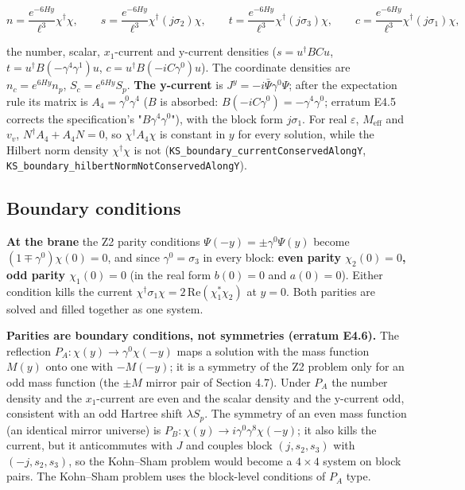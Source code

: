 \documentclass[11pt]{article}
\begin{document}
\[
n=\frac{e^{-6Hy}}{\ell^3}\chi^\dagger\chi,\qquad s=\frac{e^{-6Hy}}{\ell^3}\chi^\dagger(j\sigma_2)\chi,\qquad t=\frac{e^{-6Hy}}{\ell^3}\chi^\dagger(j\sigma_3)\chi,\qquad c=\frac{e^{-6Hy}}{\ell^3}\chi^\dagger(j\sigma_1)\chi ,
\]

the number, scalar, $x_1$-current and y-current densities ($s=u^\dagger BCu$, $t=u^\dagger B(-\gamma^4\gamma^1)u$, $c=u^\dagger B(-iC\gamma^0)u$). The coordinate densities are $n_c=e^{6Hy}n_p$, $S_c=e^{6Hy}S_p$. \textbf{The y-current} is $J^y=-i\bar\Psi\gamma^0\Psi$; after the expectation rule its matrix is $A_4=\gamma^0\gamma^4$ ($B$ is absorbed: $B(-iC\gamma^0)=-\gamma^4\gamma^0$; erratum E4.5 corrects the specification's "$B\gamma^4\gamma^0$"), with the block form $j\sigma_1$. For real $\varepsilon$, $M_{\mathrm{eff}}$ and $v_v$, $N^\dagger A_4+A_4N=0$, so $\chi^\dagger A_4\chi$ is constant in $y$ for every solution, while the Hilbert norm density $\chi^\dagger\chi$ is not (\texttt{KS\_bound\allowbreak{}ary\_curr\allowbreak{}entConse\allowbreak{}rvedAlon\allowbreak{}gY}, \texttt{KS\_bound\allowbreak{}ary\_hilb\allowbreak{}ertNormN\allowbreak{}otConser\allowbreak{}vedAlong\allowbreak{}Y}).

\subsection{Boundary conditions}

\textbf{At the brane} the Z2 parity conditions $\Psi(-y)=\pm\gamma^0\Psi(y)$ become $(1\mp\gamma^0)\chi(0)=0$, and since $\gamma^0=\sigma_3$ in every block: \textbf{even parity $\chi_2(0)=0$, odd parity $\chi_1(0)=0$} (in the real form $b(0)=0$ and $a(0)=0$). Either condition kills the current $\chi^\dagger\sigma_1\chi=2\,\mathrm{Re}(\chi_1^{\ast}\chi_2)$ at $y=0$. Both parities are solved and filled together as one system.

\textbf{Parities are boundary conditions, not symmetries (erratum E4.6).} The reflection $P_A:\chi(y)\to\gamma^0\chi(-y)$ maps a solution with the mass function $M(y)$ onto one with $-M(-y)$; it is a symmetry of the Z2 problem only for an odd mass function (the $\pm M$ mirror pair of Section 4.7). Under $P_A$ the number density and the $x_1$-current are even and the scalar density and the y-current odd, consistent with an odd Hartree shift $\lambda S_p$. The symmetry of an even mass function (an identical mirror universe) is $P_B:\chi(y)\to i\gamma^0\gamma^8\chi(-y)$; it also kills the current, but it anticommutes with $J$ and couples block $(j,s_2,s_3)$ with $(-j,s_2,s_3)$, so the Kohn--Sham problem would become a $4\times4$ system on block pairs. The Kohn--Sham problem uses the block-level conditions of $P_A$ type.
\end{document}
